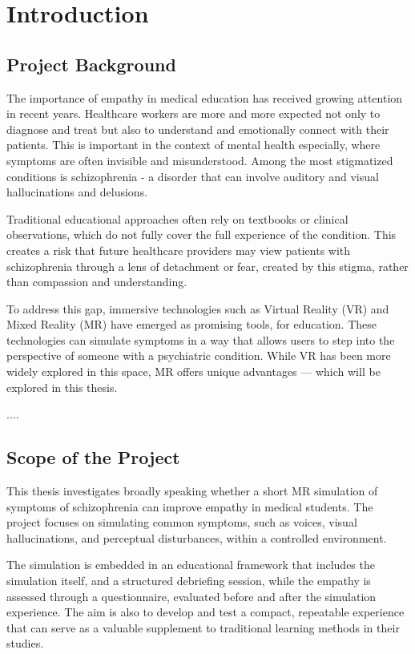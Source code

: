\chapter{Introduction}
\label{ch:introduction}


\section{Project Background}

The importance of empathy in medical education has received growing attention in recent years. Healthcare workers are more and more expected not only to diagnose and treat but also to understand and emotionally connect with their patients. This is important in the context of mental health especially, where symptoms are often invisible and misunderstood. Among the most stigmatized conditions is schizophrenia - a disorder that can involve auditory and visual hallucinations and delusions.

Traditional educational approaches often rely on textbooks or clinical observations, which do not fully cover the full experience of the condition. This creates a risk that future healthcare providers may view patients with schizophrenia through a lens of detachment or fear, created by this stigma, rather than compassion and understanding.

To address this gap, immersive technologies such as Virtual Reality (VR) and Mixed Reality (MR) have emerged as promising tools, for education. These technologies can simulate symptoms in a way that allows users to step into the perspective of someone with a psychiatric condition. While VR has been more widely explored in this space, MR offers unique advantages — which will be explored in this thesis.

.... 

\section{Scope of the Project}

This thesis investigates broadly speaking whether a short MR simulation of symptoms of schizophrenia can improve empathy in medical students. The project focuses on simulating common symptoms, such as voices, visual hallucinations, and perceptual disturbances, within a controlled environment.

The simulation is embedded in an educational framework that includes the simulation itself, and a structured debriefing session, while the empathy is assessed through a questionnaire, evaluated before and after the simulation experience. The aim is also to develop and test a compact, repeatable experience that can serve as a valuable supplement to traditional learning methods in their studies.

